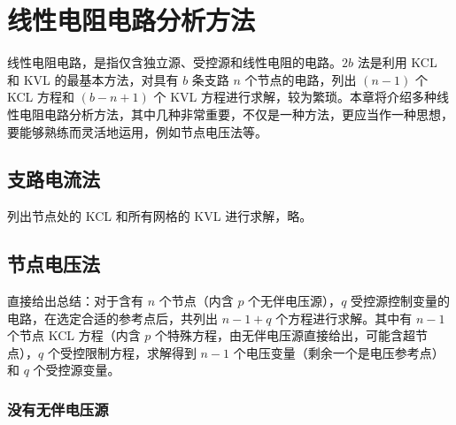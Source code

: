 \documentclass[UTF8]{report}
\theoremstyle{MyLineTheoremStyle} %
\theoremstyle{MyBlockTheoremStyle} %
\theoremstyle{MySubsubsectionStyle} %
\begin{document}
\chapter{线性电阻电路分析方法}
线性电阻电路，是指仅含独立源、受控源和线性电阻的电路。$2b$ 法是利用 KCL 和 KVL 的最基本方法，对具有 $b$ 条支路 $n$ 个节点的电路，列出 $(n -1)$ 个 KCL 方程和 $(b - n +1)$ 个 KVL 方程进行求解，较为繁琐。本章将介绍多种线性电阻电路分析方法，其中几种非常重要，不仅是一种方法，更应当作一种思想，要能够熟练而灵活地运用，例如节点电压法等。


\section{支路电流法}

列出节点处的 KCL 和所有网格的 KVL 进行求解，略。

\section{节点电压法}

直接给出总结：对于含有 $n$ 个节点（内含 $p$ 个无伴电压源），$q$ 受控源控制变量的电路，在选定合适的参考点后，共列出 $n-1+q$ 个方程进行求解。其中有 $n-1$ 个节点 KCL 方程（内含 $p$ 个特殊方程，由无伴电压源直接给出，可能含超节点），$q$ 个受控限制方程，求解得到 $ n-1 $ 个电压变量（剩余一个是电压参考点）和 $q$ 个受控源变量。

\subsection{没有无伴电压源}
\end{document}
